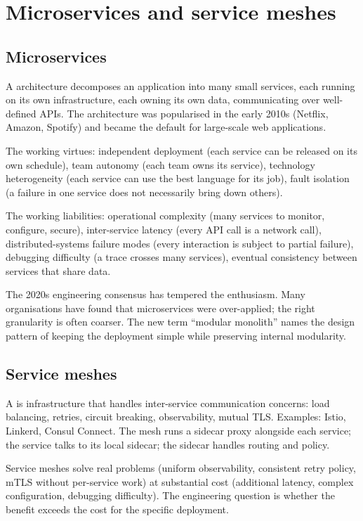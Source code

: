 \section{Microservices and service meshes}

\subsection{Microservices}

A  architecture decomposes an application into many small services, each running on its own infrastructure, each owning its own data, communicating over well-defined APIs. The architecture was popularised in the early 2010s (Netflix, Amazon, Spotify) and became the default for large-scale web applications.

The working virtues: independent deployment (each service can be released on its own schedule), team autonomy (each team owns its service), technology heterogeneity (each service can use the best language for its job), fault isolation (a failure in one service does not necessarily bring down others).

The working liabilities: operational complexity (many services to monitor, configure, secure), inter-service latency (every API call is a network call), distributed-systems failure modes (every interaction is subject to partial failure), debugging difficulty (a trace crosses many services), eventual consistency between services that share data.

The 2020s engineering consensus has tempered the enthusiasm. Many organisations have found that microservices were over-applied; the right granularity is often coarser. The new term ``modular monolith'' names the design pattern of keeping the deployment simple while preserving internal modularity.

\subsection{Service meshes}

A  is infrastructure that handles inter-service communication concerns: load balancing, retries, circuit breaking, observability, mutual TLS. Examples: Istio, Linkerd, Consul Connect. The mesh runs a sidecar proxy alongside each service; the service talks to its local sidecar; the sidecar handles routing and policy.

Service meshes solve real problems (uniform observability, consistent retry policy, mTLS without per-service work) at substantial cost (additional latency, complex configuration, debugging difficulty). The engineering question is whether the benefit exceeds the cost for the specific deployment.

